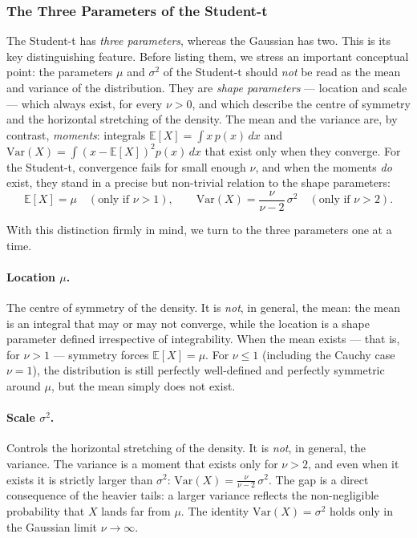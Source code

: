 \documentclass[11pt, a4paper, oneside]{article}
\begin{document}
\newpage 

\subsubsection{The Three Parameters of the Student-t}

The Student-t has \emph{three parameters}, whereas the Gaussian has two.
This is its key distinguishing feature. Before listing them, we stress an
important conceptual point: the parameters $\mu$ and $\sigma^{2}$ of the
Student-t should \emph{not} be read as the mean and variance of the
distribution. They are \emph{shape parameters} — location and scale —
which always exist, for every $\nu > 0$, and which describe the centre of
symmetry and the horizontal stretching of the density. The mean and the
variance are, by contrast, \emph{moments}: integrals
$\mathbb{E}[X] = \int x\,p(x)\,dx$ and
$\mathrm{Var}(X) = \int (x-\mathbb{E}[X])^{2} p(x)\,dx$ that exist only
when they converge. For the Student-t, convergence fails for small enough
$\nu$, and when the moments \emph{do} exist, they stand in a precise but
non-trivial relation to the shape parameters:
\[
\mathbb{E}[X] = \mu \quad (\text{only if } \nu > 1),
\qquad
\mathrm{Var}(X) = \frac{\nu}{\nu - 2}\,\sigma^{2} \quad (\text{only if } \nu > 2).
\]

With this distinction firmly in mind, we turn to the three parameters one
at a time.

\paragraph{Location $\mu$.}
The centre of symmetry of the density. It is \emph{not}, in general, the
mean: the mean is an integral that may or may not converge, while the
location is a shape parameter defined irrespective of integrability. When
the mean exists — that is, for $\nu > 1$ — symmetry forces
$\mathbb{E}[X] = \mu$. For $\nu \leq 1$ (including the Cauchy case
$\nu = 1$), the distribution is still perfectly well-defined and perfectly
symmetric around $\mu$, but the mean simply does not exist.

\paragraph{Scale $\sigma^{2}$.}
Controls the horizontal stretching of the density. It is \emph{not}, in
general, the variance. The variance is a moment that exists only for
$\nu > 2$, and even when it exists it is strictly larger than $\sigma^{2}$:
$\mathrm{Var}(X) = \tfrac{\nu}{\nu-2}\,\sigma^{2}$. The gap is a direct
consequence of the heavier tails: a larger variance reflects the
non-negligible probability that $X$ lands far from $\mu$. The identity
$\mathrm{Var}(X) = \sigma^{2}$ holds only in the Gaussian limit
$\nu \to \infty$.
\end{document}
